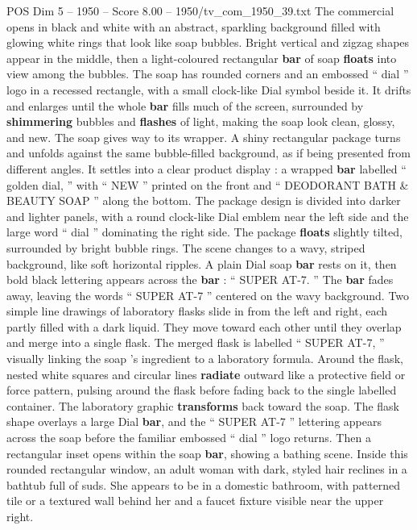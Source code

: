 \begin{textsample}{POS Dim 5 – 1950 – Score 8.00 – 1950/tv\_com\_1950\_39.txt}  \label{ex:f5_pos_072}
The commercial opens in black and white with an abstract, sparkling background filled with glowing white rings that look like soap bubbles.
Bright vertical and zigzag shapes appear in the middle, then a light-coloured rectangular \textbf{bar} of soap \textbf{floats} into view among the bubbles.
The soap has rounded corners and an embossed “ dial ” logo in a recessed rectangle, with a small clock-like Dial symbol beside it.
It drifts and enlarges until the whole \textbf{bar} fills much of the screen, surrounded by \textbf{shimmering} bubbles and \textbf{flashes} of light, making the soap look clean, glossy, and new.
The soap gives way to its wrapper.
A shiny rectangular package turns and unfolds against the same bubble-filled background, as if being presented from different angles.
It settles into a clear product display : a wrapped \textbf{bar} labelled “ golden dial, ” with “ NEW ” printed on the front and “ DEODORANT BATH \& BEAUTY SOAP ” along the bottom.
The package design is divided into darker and lighter panels, with a round clock-like Dial emblem near the left side and the large word “ dial ” dominating the right side.
The package \textbf{floats} slightly tilted, surrounded by bright bubble rings.
The scene changes to a wavy, striped background, like soft horizontal ripples.
A plain Dial soap \textbf{bar} rests on it, then bold black lettering appears across the \textbf{bar} : “ SUPER AT-7. ” The \textbf{bar} fades away, leaving the words “ SUPER AT-7 ” centered on the wavy background.
Two simple line drawings of laboratory flasks slide in from the left and right, each partly filled with a dark liquid.
They move toward each other until they overlap and merge into a single flask.
The merged flask is labelled “ SUPER AT-7, ” visually linking the soap ’s ingredient to a laboratory formula.
Around the flask, nested white squares and circular lines \textbf{radiate} outward like a protective field or force pattern, pulsing around the flask before fading back to the single labelled container.
The laboratory graphic \textbf{transforms} back toward the soap.
The flask shape overlays a large Dial \textbf{bar}, and the “ SUPER AT-7 ” lettering appears across the soap before the familiar embossed “ dial ” logo returns.
Then a rectangular inset opens within the soap \textbf{bar}, showing a bathing scene.
Inside this rounded rectangular window, an adult woman with dark, styled hair reclines in a bathtub full of suds.
She appears to be in a domestic bathroom, with patterned tile or a textured wall behind her and a faucet fixture visible near the upper right.

\end{textsample}
